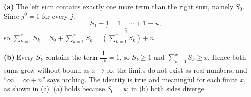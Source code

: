 \textbf{(a)} The left sum contains exactly one more term than the right sum, namely $S_0$. Since $j^0=1$ for every $j$,
\[
S_0=\underbrace{1+1+\cdots+1}_{n}=n ,
\]
so $\sum_{k=0}^xS_k=S_0+\sum_{k=1}^xS_k=\left(\sum_{k=1}^xS_k\right)+n$.

\textbf{(b)} Every $S_k$ contains the term $\dfrac{1}{1^k}=1$, so $S_k\ge1$ and $\sum_{k=1}^xS_k\ge x$. Hence both sums grow without bound as $x\to\infty$: the limits do not exist as real numbers, and ``$\infty=\infty+n$'' says nothing. The identity is true and meaningful for each finite $x$, as shown in (a). $\boxed{\text{(a) holds because }S_0=n\text{; in (b) both sides diverge}}$
